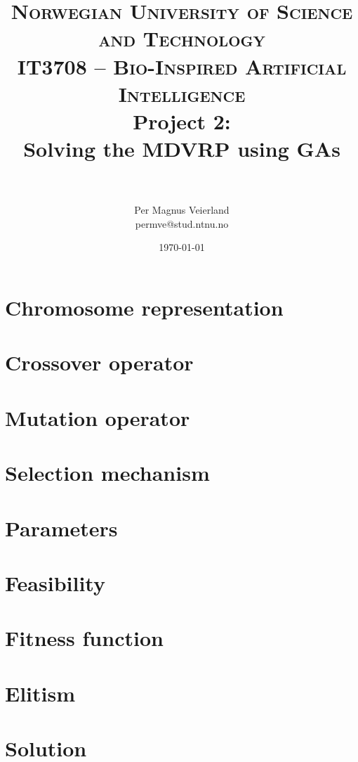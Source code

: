 \documentclass[paper=a4, fontsize=10pt]{scrartcl}
\title{
\vspace{-1cm}
\normalfont \normalsize
\textsc{Norwegian University of Science and Technology\\IT3708 -- Bio-Inspired Artificial Intelligence}
\horrule{0.5pt} \\[0cm]
\huge Project 2:\\ Solving the \ac{MDVRP} using \acp{GA} \\[-0.3cm]
\horrule{2pt} \\[0.1cm]
}
\author{Per Magnus Veierland\\permve@stud.ntnu.no}
\date{\normalsize\today}
\begin{document}
\maketitle

\begin{multicols}{2}

\section*{Chromosome representation}

\section*{Crossover operator}

\section*{Mutation operator}

\section*{Selection mechanism}

\section*{Parameters}

\section*{Feasibility}


\section*{Fitness function}

\section*{Elitism}


\section*{Solution}


\end{multicols}
\end{document}
